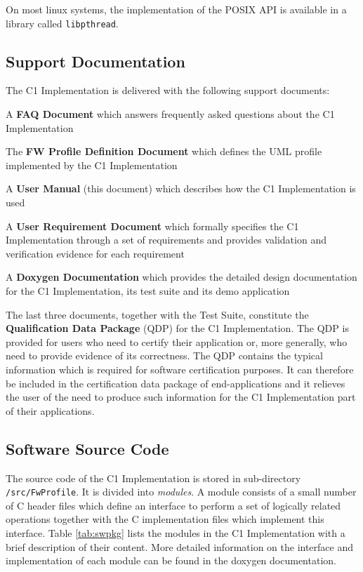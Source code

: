 \documentclass[a4paper,10pt]{article}
\newenvironment{fw_itemize}						%
{\begin{itemize}
  \setlength{\itemsep}{1mm}
  \setlength{\parskip}{0pt}
  \setlength{\parsep}{0pt}}
{\end{itemize}}
\begin{document}
On most linux systems, the implementation of the POSIX API is available in a library called \texttt{libpthread}. 

\subsection{Support Documentation}\label{sec:supportDoc}
The C1 Implementation is delivered with the following support documents: 

\begin{fw_itemize}
\item A \textbf{FAQ Document} which answers frequently asked questions about the C1 Implementation
\item The \textbf{FW Profile Definition Document} which defines the UML profile implemented by the C1 Implementation
\item A \textbf{User Manual} (this document) which describes how the C1 Implementation is used
\item A \textbf{User Requirement Document} which formally specifies the C1 Implementation
through a set of requirements and provides validation and verification evidence for each requirement
\item A \textbf{Doxygen Documentation} which provides the detailed design documentation for the C1 Implementation, its test suite and its demo application
\end{fw_itemize}

The last three documents, together with the Test Suite, constitute the \textbf{Qualification Data Package} (QDP) for the C1 Implementation. The QDP is provided for users who need to certify their application or, more generally, who need to provide evidence of its correctness. The QDP contains the typical information which is required for software certification purposes. It can therefore be included in the certification data package of end-applications and it relieves the user of the need to produce such information for the C1 Implementation part of their applications.

\subsection{Software Source Code}\label{sec:sourceCode}
The source code of the C1 Implementation is stored in sub-directory \texttt{/src/FwProfile}. It is divided into \emph{modules}. A module consists of a small number of C header files which define an interface to perform a set of logically related operations together with the C implementation files which implement this interface. Table \ref{tab:swpkg} lists the modules in the C1 Implementation with a brief description of their content. More detailed information on the interface and implementation of each module can be found in the doxygen documentation.
\end{document}
